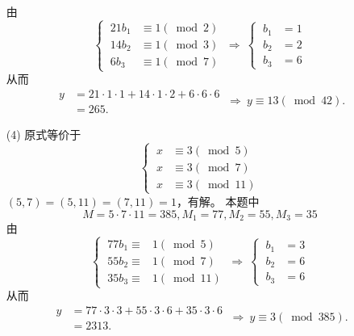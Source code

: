 \documentclass[UTF8]{ctexart}
\begin{document}
\begin{enumerate}
\[    \]
    由
    \[
        \begin{cases}
            \ 21 b_1 & \equiv 1 (\bmod 2)\\ 
            \ 14 b_2 & \equiv 1 (\bmod 3)\\
            \ 6  b_3 & \equiv 1 (\bmod 7)
        \end{cases}  
        \ \Rightarrow\ 
        \begin{cases}
            \ b_1 & = 1 \\
            \ b_2 & = 2 \\
            \ b_3 & = 6
        \end{cases}
    \]
    从而
    \[
        \begin{aligned}
            y 
            & = 21\cdot 1 \cdot 1 + 14\cdot 1 \cdot 2 + 6\cdot 6\cdot 6 \\
            & = 265 . 
        \end{aligned}
        \ \Rightarrow\ 
        y\equiv 13 (\bmod 42).
    \]
    \item [(4)]原式等价于
    \[
        \begin{cases}
            \ x & \equiv 3 (\bmod 5)\\
            \ x & \equiv 3 (\bmod 7)\\
            \ x & \equiv 3 (\bmod 11)
        \end{cases}  
    \]
    $(5,7)=(5,11)=(7,11)=1$，有解。
    本题中
    \[
        M = 5\cdot 7\cdot 11 = 385 , M_1 = 77 , M_2 = 55 , M_3 = 35
    \]
    由
    \[
        \begin{cases}
            \ 77 b_1 \equiv & 1 (\bmod 5)   \\
            \ 55 b_2 \equiv & 1 (\bmod 7)   \\
            \ 35 b_3 \equiv & 1 (\bmod 11)
        \end{cases}  
        \ \Rightarrow\ 
        \begin{cases}
            \ b_1 & = 3\\ 
            \ b_2 & = 6\\
            \ b_3 & = 6
        \end{cases}
    \]
    从而
    \[
        \begin{aligned}
            y 
            & = 77\cdot 3 \cdot 3 + 55\cdot 3 \cdot 6 + 35\cdot 3\cdot 6 \\
            & = 2313 . 
        \end{aligned}
        \ \Rightarrow\ 
        y\equiv 3 (\bmod 385).
    \]
\end{enumerate}
\end{document}
